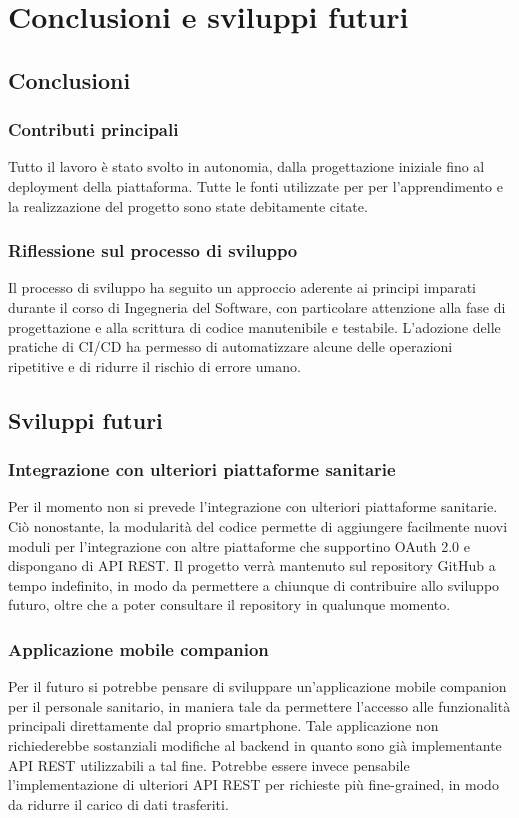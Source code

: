 \documentclass[12pt,a4paper,oneside]{report}
\begin{document}
\chapter{Conclusioni e sviluppi futuri}
\section{Conclusioni}
\subsection{Contributi principali}
Tutto il lavoro è stato svolto in autonomia, dalla progettazione iniziale fino al deployment della piattaforma.
Tutte le fonti utilizzate per per l'apprendimento e la realizzazione del progetto sono state debitamente citate.

\subsection{Riflessione sul processo di sviluppo}
Il processo di sviluppo ha seguito un approccio aderente ai principi imparati durante il corso di Ingegneria del Software, con particolare attenzione alla fase di progettazione e alla scrittura di codice manutenibile e testabile.
L'adozione delle pratiche di CI/CD ha permesso di automatizzare alcune delle operazioni ripetitive e di ridurre il rischio di errore umano.

\section{Sviluppi futuri}
\subsection{Integrazione con ulteriori piattaforme sanitarie}
Per il momento non si prevede l'integrazione con ulteriori piattaforme sanitarie. Ciò nonostante, la modularità del codice permette di aggiungere facilmente nuovi moduli per l'integrazione con altre piattaforme che supportino OAuth 2.0 e dispongano di API REST.
Il progetto verrà mantenuto sul repository GitHub a tempo indefinito, in modo da permettere a chiunque di contribuire allo sviluppo futuro, oltre che a poter consultare il repository in qualunque momento.

\subsection{Applicazione mobile companion}
Per il futuro si potrebbe pensare di sviluppare un'applicazione mobile companion per il personale sanitario, in maniera tale da permettere l'accesso alle funzionalità principali direttamente dal proprio smartphone.
Tale applicazione non richiederebbe sostanziali modifiche al backend in quanto sono già implementante API REST utilizzabili a tal fine. Potrebbe essere invece pensabile l'implementazione di ulteriori API REST per richieste più fine-grained, in modo da ridurre il carico di dati trasferiti.
\end{document}
